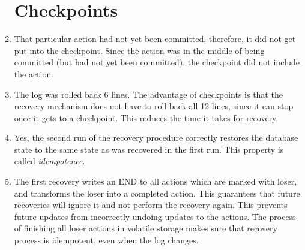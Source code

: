 \documentclass[psamsfonts]{amsart}
\begin{document}
\begin{enumerate}
    \section{Checkpoints}
  \item That particular action had not yet been committed, therefore, it did not get put into the checkpoint. Since the action was in the middle of being committed (but had not yet been committed), the checkpoint did not include the action.
  \item The log was rolled back 6 lines. The advantage of checkpoints is that the recovery mechanism does not have to roll back all 12 lines, since it can stop once it gets to a checkpoint. This reduces the time it takes for recovery.
  \item Yes, the second run of the recovery procedure correctly restores the database state to the same state as was recovered in the first run. This property is called \emph{idempotence}.
  \item The first recovery writes an END to all actions which are marked with loser, and transforms the loser into a completed action. This guarantees that future recoveries will ignore it and not perform the recovery again. This prevents future updates from incorrectly undoing updates to the actions. The process of finishing all loser actions in volatile storage makes sure that recovery process is idempotent, even when the log changes.

\end{enumerate}
\end{document}
